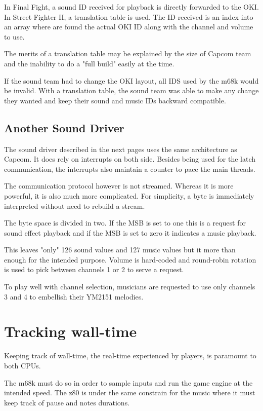 In Final Fight, a sound ID received for playback is directly forwarded to the OKI. In Street Fighter II, a translation table is used. The ID received is an index into an array where are found the actual OKI ID along with the channel and volume to use.

The merits of a translation table may be explained by the size of Capcom team and the inability to do a "full build" easily at the time.

If the sound team had to change the OKI layout, all IDS used by the m68k would be invalid. With a translation table, the sound team was able to make any change they wanted and keep their sound and music IDs backward compatible.


\subsection{Another Sound Driver}

The sound driver described in the next pages uses the same architecture as Capcom. It does rely on interrupts on both side. Besides being used for the latch communication, the interrupts also maintain a counter to pace the main threads.


The communication protocol however is not streamed. Whereas it is more powerful, it is also much more complicated. For simplicity, a byte is immediately interpreted without need to rebuild a stream.

The byte space is divided in two. If the MSB is set to one  this is a request for sound effect playback and if the MSB is set to zero  it indicates a music playback. 

This leaves "only" 126 sound values and 127 music values but it more than enough for the intended purpose. Volume is hard-coded and round-robin rotation is used to pick between channels 1 or 2 to serve a request. 

To play well with channel selection, musicians are requested to use only channels 3 and 4 to embellish their YM2151 melodies. 


\section{Tracking wall-time}
Keeping track of wall-time, the real-time experienced by players, is paramount to both CPUs. 

The m68k must do so in order to sample inputs and run the game engine at the intended speed. The z80 is under the same constrain for the music where it must keep track of pause and notes durations. 

